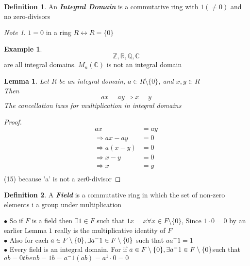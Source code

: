 \documentclass{article}
\theoremstyle{plain}
\newtheorem{lem}[thm]{Lemma}
\theoremstyle{definition}
\newtheorem{defn}{Definition}[section]
\newtheorem{exmp}{Example}[section]
\theoremstyle{remark}
\newtheorem*{note}{Note}
\begin{document}
\begin{defn}
An \textit{\textbf{Integral Domain}} is a commutative ring with $1(\not= 0)$ and no zero-divisors
\begin{note}
$1 = 0$ in a ring $R \leftrightarrow R = \{0\}$
\end{note}
\end{defn}
\begin{exmp}
\[\mathbb{Z}, \mathbb{R}, \mathbb{Q}, \mathbb{C}\] are all integral domains. $M_n(\mathbb{C})$ is not an integral domain
\end{exmp}
\begin{lem}
Let $R$ be an integral domain, $a \in R \setminus \{0\}$, and $x,y \in R$\\
Then \begin{equation}
	ax = ay \Rightarrow x = y
\end{equation}
The cancellation laws for multiplication in integral domains
\end{lem}

\begin{proof}

\begin{align}
	ax &= ay \\
	\Rightarrow ax - ay &= 0 \\
	\Rightarrow a(x - y) &= 0 \\
	\Rightarrow x - y &= 0 \\
	\Rightarrow x &= y\\
\end{align}
(15) because 'a' is not a zer0-divisor
\end{proof}
\begin{defn}
A \textbf{\textit{Field}} is a commutative ring in which the set of non-zero elements i a group under multiplication
\end{defn}
$\bullet$ So if $F$ is a field then $\exists 1 \in F$ such that $1x = x \forall x \in F \setminus \{0\} $, Since $1 \cdot 0 = 0$ by an earlier Lemma $1$ really is the multiplicative identity of $F$\\
\hspace*{10px} $\bullet$ Also for each $a \in F \setminus \{0\},\\ \exists a^-1 \in F \setminus \{0\}$ such that $aa^-1 = 1$\\
\hspace*{10px} $\bullet$ Every field is an integral domain. For if $a \in F \setminus \{0\}, \exists a^-1 \in F \setminus \{0\}\\
$such that$ab = 0 then b = 1b = a^-1(ab) = a^1 \cdot 0 = 0$
\end{document}
